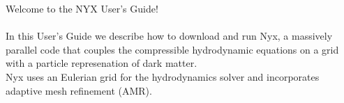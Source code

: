 \noindent Welcome to the NYX User's Guide!\\ \\

In this User's Guide we describe how to download and run Nyx, a massively parallel code
that couples the compressible hydrodynamic equations on a grid with a particle represenation
of dark matter. \\

Nyx uses an Eulerian grid for the hydrodynamics solver and incorporates adaptive mesh refinement (AMR).


